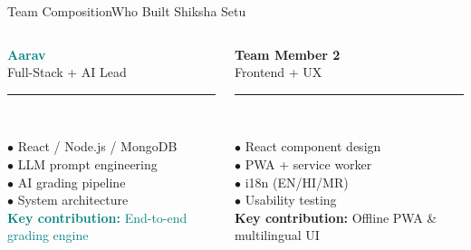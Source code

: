 \begin{frame}[t,shrink=5]{Team Composition}{Who Built Shiksha Setu}
\begin{columns}[T]

\vspace{4pt}
\colorbox{card}{\parbox{0.92\linewidth}{%
  \vspace{6pt}\centering
  \textcolor{teal}{\large\textbf{Aarav}}\\
  \textcolor{txtsec}{\scriptsize Full-Stack + AI Lead}\\[4pt]
  \textcolor{cardbdr}{\rule{0.8\linewidth}{0.3pt}}\\[4pt]
  \raggedright
  \textcolor{txtsec}{\scriptsize$\bullet$} \textcolor{txt}{\scriptsize React / Node.js / MongoDB}\\[2pt]
  \textcolor{txtsec}{\scriptsize$\bullet$} \textcolor{txt}{\scriptsize LLM prompt engineering}\\[2pt]
  \textcolor{txtsec}{\scriptsize$\bullet$} \textcolor{txt}{\scriptsize AI grading pipeline}\\[2pt]
  \textcolor{txtsec}{\scriptsize$\bullet$} \textcolor{txt}{\scriptsize System architecture}\\[4pt]
  \textcolor{teal}{\scriptsize\textbf{Key contribution:} End-to-end grading engine}\\[6pt]
}}

\vspace{4pt}
\colorbox{card}{\parbox{0.92\linewidth}{%
  \vspace{6pt}\centering
  \textcolor{orng}{\large\textbf{Team Member 2}}\\
  \textcolor{txtsec}{\scriptsize Frontend + UX}\\[4pt]
  \textcolor{cardbdr}{\rule{0.8\linewidth}{0.3pt}}\\[4pt]
  \raggedright
  \textcolor{txtsec}{\scriptsize$\bullet$} \textcolor{txt}{\scriptsize React component design}\\[2pt]
  \textcolor{txtsec}{\scriptsize$\bullet$} \textcolor{txt}{\scriptsize PWA + service worker}\\[2pt]
  \textcolor{txtsec}{\scriptsize$\bullet$} \textcolor{txt}{\scriptsize i18n (EN/HI/MR)}\\[2pt]
  \textcolor{txtsec}{\scriptsize$\bullet$} \textcolor{txt}{\scriptsize Usability testing}\\[4pt]
  \textcolor{orng}{\scriptsize\textbf{Key contribution:} Offline PWA \& multilingual UI}\\[6pt]
}}


\end{columns}
\end{frame}
